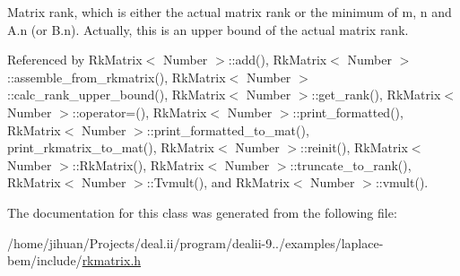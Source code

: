 Matrix rank, which is either the actual matrix rank or the minimum of {\ttfamily m}, {\ttfamily n} and {\ttfamily A.\+n} (or {\ttfamily B.\+n}). Actually, this is an upper bound of the actual matrix rank. 

Referenced by Rk\+Matrix$<$ Number $>$\+::add(), Rk\+Matrix$<$ Number $>$\+::assemble\+\_\+from\+\_\+rkmatrix(), Rk\+Matrix$<$ Number $>$\+::calc\+\_\+rank\+\_\+upper\+\_\+bound(), Rk\+Matrix$<$ Number $>$\+::get\+\_\+rank(), Rk\+Matrix$<$ Number $>$\+::operator=(), Rk\+Matrix$<$ Number $>$\+::print\+\_\+formatted(), Rk\+Matrix$<$ Number $>$\+::print\+\_\+formatted\+\_\+to\+\_\+mat(), print\+\_\+rkmatrix\+\_\+to\+\_\+mat(), Rk\+Matrix$<$ Number $>$\+::reinit(), Rk\+Matrix$<$ Number $>$\+::\+Rk\+Matrix(), Rk\+Matrix$<$ Number $>$\+::truncate\+\_\+to\+\_\+rank(), Rk\+Matrix$<$ Number $>$\+::\+Tvmult(), and Rk\+Matrix$<$ Number $>$\+::vmult().



The documentation for this class was generated from the following file\+:\begin{DoxyCompactItemize}
\item 
/home/jihuan/\+Projects/deal.\+ii/program/dealii-\/9../examples/laplace-\/bem/include/\hyperlink{rkmatrix_8h}{rkmatrix.\+h}\end{DoxyCompactItemize}
